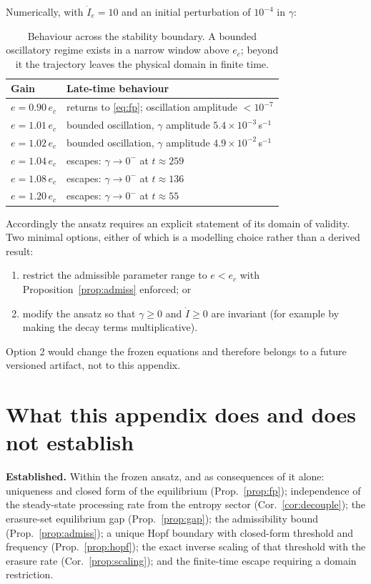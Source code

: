 \documentclass[11pt,a4paper]{article}
\theoremstyle{definition}
\begin{document}
Numerically, with $\dot I_e=10$ and an initial perturbation of $10^{-4}$ in
$\gamma$:

\begin{table}[h]
\centering
\begin{tabularx}{\textwidth}{lX}
\toprule
\textbf{Gain} & \textbf{Late-time behaviour}\\
\midrule
$e=0.90\,e_c$ & returns to \eqref{eq:fp}; oscillation amplitude $<10^{-7}$\\
$e=1.01\,e_c$ & bounded oscillation, $\gamma$ amplitude $5.4\times10^{-3}$\,s$^{-1}$\\
$e=1.02\,e_c$ & bounded oscillation, $\gamma$ amplitude $4.9\times10^{-2}$\,s$^{-1}$\\
$e=1.04\,e_c$ & escapes: $\gamma\to 0^{-}$ at $t\approx259$\\
$e=1.08\,e_c$ & escapes: $\gamma\to 0^{-}$ at $t\approx136$\\
$e=1.20\,e_c$ & escapes: $\gamma\to 0^{-}$ at $t\approx55$\\
\bottomrule
\end{tabularx}
\caption{Behaviour across the stability boundary. A bounded oscillatory regime
exists in a narrow window above $e_c$; beyond it the trajectory leaves the
physical domain in finite time.}
\end{table}

Accordingly the ansatz requires an explicit statement of its domain of
validity. Two minimal options, either of which is a modelling choice rather
than a derived result:
\begin{enumerate}
\item restrict the admissible parameter range to $e<e_c$ with
Proposition~\ref{prop:admiss} enforced; or
\item modify the ansatz so that $\gamma\ge0$ and $\dot I\ge0$ are invariant
(for example by making the decay terms multiplicative).
\end{enumerate}
Option 2 would change the frozen equations and therefore belongs to a future
versioned artifact, not to this appendix.

\section{What this appendix does and does not establish}

\noindent\textbf{Established.} Within the frozen ansatz, and as consequences of
it alone: uniqueness and closed form of the equilibrium
(Prop.~\ref{prop:fp}); independence of the steady-state processing rate from
the entropy sector (Cor.~\ref{cor:decouple}); the erasure-set equilibrium gap
(Prop.~\ref{prop:gap}); the admissibility bound (Prop.~\ref{prop:admiss}); a
unique Hopf boundary with closed-form threshold and frequency
(Prop.~\ref{prop:hopf}); the exact inverse scaling of that threshold with the
erasure rate (Cor.~\ref{prop:scaling}); and the finite-time escape requiring a
domain restriction.
\end{document}

